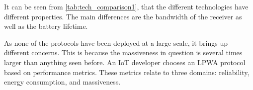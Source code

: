 
It can be seen from \autoref{tab:tech_comparison1}, that the different technologies have different properties. The main differences are the bandwidth of the receiver as well as the battery lifetime. 

As none of the protocols have been deployed at a large scale, it brings up different concerns. This is because the massiveness in question is several times larger than anything seen before.  An IoT developer chooses an LPWA protocol based on performance metrics. These metrics relate to three domains: reliability, energy consumption, and massiveness. 

